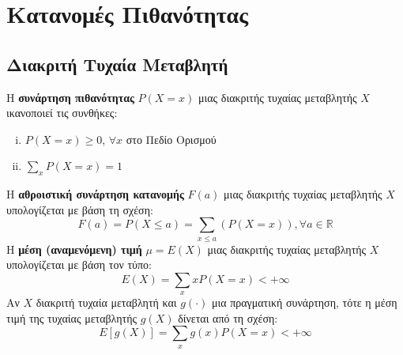 

\section{Κατανομές Πιθανότητας}



\begin{minipage}[t]{.48\textwidth}
  \subsection*{Διακριτή Τυχαία Μεταβλητή}

  Η \textbf{συνάρτηση πιθανότητας} $P(X=x)$ μιας διακριτής τυχαίας μεταβλητής
  $X$ ικανοποιεί τις συνθήκες:
  \begin{enumerate}[i)]
    \item $P(X=x) \geq 0$, $\forall x$ στο Πεδίο Ορισμού
    \item $\sum_{x}P(X=x)=1$
  \end{enumerate}
  Η \textbf{αθροιστική συνάρτηση κατανομής} $F(a)$ μιας διακριτής τυχαίας
  μεταβλητής $X$ υπολογίζεται με βάση τη σχέση:
  \begin{equation*}
    F(a)=P(X\leq a)=\sum_{x\leq a}(P(X=x)), \forall a\in\mathbb{R}
  \end{equation*}
  Η \textbf{μέση (αναμενόμενη) τιμή} $\mu=E(X)$ μιας διακριτής τυχαίας
  μεταβλητής $X$ υπολογίζεται με βάση τον τύπο:
  \begin{equation*}
    E(X)=\sum_{x}xP(X=x)< +\infty
  \end{equation*}
  Αν $X$ διακριτή τυχαία μεταβλητή και $g(\cdot)$ μια πραγματική συνάρτηση, τότε
  η μέση τιμή της τυχαίας μεταβλητής $g(X)$ δίνεται από τη σχέση:
  \begin{equation*}
    E[g(X)]=\sum_{x}g(x)P(X=x)<+\infty
  \end{equation*}
\end{minipage}
\hfill
